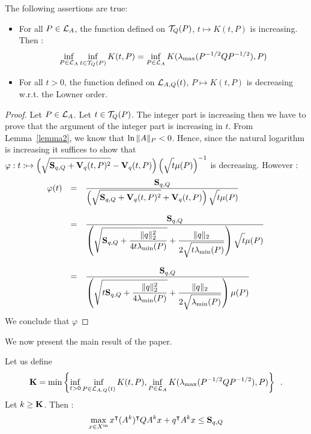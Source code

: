 \documentclass[10pt]{article}
\begin{document}
\begin{prop}
The following assertions are true:
\begin{itemize}
\item For all $P\in\mathcal{L}_{A}$, the function defined on $\mathcal{T}_{Q}(P)$, $t\mapsto K(t,P)$ is increasing. Then : 
\[
\inf_{P\in\mathcal{L}_{A}} \inf_{t\in\mathcal{T}_{Q}(P)} K(t,P)=\inf_{P\in\mathcal{L}_{A}}K(\lambda_{\operatorname{max}}(P^{-1/2} Q P^{-1/2}),P)
\]
\item For all $t>0$, the function defined on $\mathcal{L}_{A,Q}(t)$, $P\mapsto K(t,P)$ is decreasing w.r.t. the Lowner order.
\end{itemize}
\end{prop}

\begin{proof}
Let $P\in\mathcal{L}_{A}$. Let $t\in\mathcal{T}_{Q}(P)$. The integer part is increasing then we have to prove that the argument of the integer part is increasing in $t$. From Lemma~\ref{lemma2}, we know that $\ln{\| A\|_P}<0$. Hence, since the natural logarithm is increasing it suffices to show that $\varphi:t:\mapsto \left(\sqrt{\strut \mathbf{S}_{q,Q}+\mathbf{V}_{q}(t,P)^2}-\mathbf{V}_{q}(t,P)\right)\left(\sqrt{\strut t}\mu(P)\right)^{-1}$ is decreasing. However :
\[
\begin{array}{lll}
\varphi(t)&=&\dfrac{\mathbf{S}_{q,Q}}{\left(\sqrt{\strut \mathbf{S}_{q,Q}+\mathbf{V}_{q}(t,P)^2}+\mathbf{V}_{q}(t,P)\right)\sqrt{\strut t}\mu(P)}\\
\\
&=&\dfrac{\mathbf{S}_{q,Q}}{\left(\sqrt{\strut \mathbf{S}_{q,Q}+\dfrac{\| q\|_2^2 }{4t\lambda_{\operatorname{min}}(P)}}+\dfrac{\| q\|_2 }{2\sqrt{\strut t\lambda_{\operatorname{min}}(P)}}\right)\sqrt{\strut t}\mu(P)}\\
\\
&=&\dfrac{\mathbf{S}_{q,Q}}{\left(\sqrt{\strut t\mathbf{S}_{q,Q}+\dfrac{\| q\|_2^2 }{4\lambda_{\operatorname{min}}(P)}}+\dfrac{\| q\|_2 }{2\sqrt{\strut \lambda_{\operatorname{min}}(P)}}\right)\mu(P)}
\end{array}
\]
We conclude that $\varphi$
\end{proof}

We now present the main result of the paper. %

\begin{theorem}
\label{thfond}
Let us define \[\mathbf{K}=\min\left\{\inf_{t>0}\inf_{P\in\mathcal{L}_{A,Q}(t)} K(t,P),\inf_{P\in\mathcal{L}_{A}} K(\lambda_{\operatorname{max}}(P^{-1/2}QP^{-1/2}),P)\right\}\enspace .\] Let $k\geq \mathbf{K}$. Then : 
\[
\max_{x\in X^\mathrm{in}} x^\intercal (A^k)^\intercal Q A^k x+q^\intercal A^k x\leq \mathbf{S}_{q,Q}
\]
\end{theorem}
\end{document}
